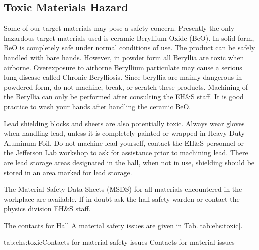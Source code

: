 \begin{safetyen}{0}{0}
\section{Toxic Materials Hazard} 
\label{sec:toxichazard}
\end{safetyen}

 Some of our target materials may pose a safety concern. Presently the
 only hazardous target materials used is ceramic Beryllium-Oxide (BeO).
 In solid form, BeO is completely safe under normal conditions of use.
 The product can be safely handled with bare hands. However, in powder form 
 all Beryllia are toxic when airborne. Overexposure to airborne Beryllium particulate 
 may cause a serious lung disease called Chronic Berylliosis. 
 Since beryllia are mainly dangerous in powdered form, do not machine, break, or 
 scratch these products. Machining of the Beryllia can only be performed after 
 consulting the EH\&S staff. It is good practice to wash your hands after handling 
 the ceramic BeO.

 Lead shielding blocks and sheets are also potentially toxic. Always wear gloves 
 when handling lead, unless it is completely painted or wrapped in Heavy-Duty 
 Aluminum Foil. Do not machine lead yourself, contact the EH\&S personnel or 
 the Jefferson Lab workshop to ask for assistance prior to machining lead. There 
 are lead storage areas designated in the hall, when not in use, shielding should 
 be stored in an area marked for lead storage.

 The Material Safety Data Sheets (MSDS) for all materials encountered in the workplace 
 are available. If in doubt ask the hall safety warden or contact the physics division 
 EH\&S staff.

 The contacts for Hall A material safety issues are given in Tab.\ref{tab:ehs:toxic}.
 
 \begin{namestab}{tab:ehs:toxic}{Contacts for material safety issues}{%
   Contacts for material issues}
 \end{namestab}

\obsolete{
} 

%
%
